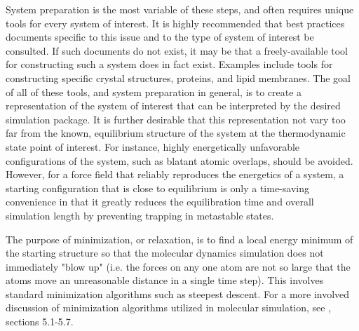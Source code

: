 \documentclass[9pt,bestpractices]{livecoms}
\begin{document}
System preparation is the most variable of these steps, and often requires unique tools for every system of interest.
It is highly recommended that best practices documents specific to this issue and to the type of system of interest be consulted.
If such documents do not exist, it may be that a freely-available tool for constructing such a system does in fact exist.
Examples include tools for constructing specific crystal structures, proteins, and lipid membranes.
The goal of all of these tools, and system preparation in general, is to create a representation of the system of interest that can be interpreted by the desired simulation package.
It is further desirable that this representation not vary too far from the known, equilibrium structure of the system at the thermodynamic state point of interest.
For instance, highly energetically unfavorable configurations of the system, such as blatant atomic overlaps, should be avoided.
However, for a force field that reliably reproduces the energetics of a system, a starting configuration that is close to equilibrium is only a time-saving convenience in that it greatly reduces the equilibration time and overall simulation length by preventing trapping in metastable states.

The purpose of minimization, or relaxation, is to find a local energy minimum of the starting structure so that the molecular dynamics simulation does not immediately "blow up" (i.e. the forces on any one atom are not so large that the atoms move an unreasonable distance in a single time step).
This involves standard minimization algorithms such as steepest descent.
For a more involved discussion of minimization algorithms utilized in molecular simulation, see \citet{LeachBook}, sections 5.1-5.7.
\end{document}
